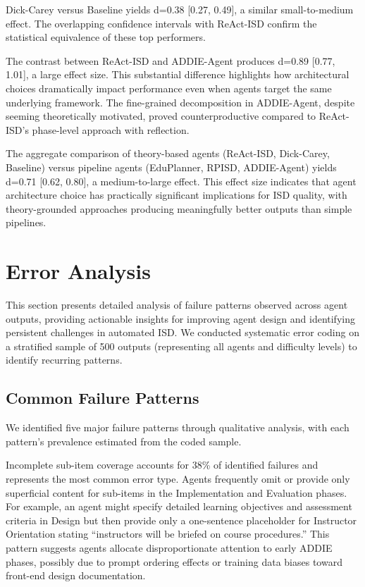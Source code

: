 Dick-Carey versus Baseline yields d=0.38 [0.27, 0.49], a similar small-to-medium effect. The overlapping confidence intervals with ReAct-ISD confirm the statistical equivalence of these top performers.

The contrast between ReAct-ISD and ADDIE-Agent produces d=0.89 [0.77, 1.01], a large effect size. This substantial difference highlights how architectural choices dramatically impact performance even when agents target the same underlying framework. The fine-grained decomposition in ADDIE-Agent, despite seeming theoretically motivated, proved counterproductive compared to ReAct-ISD's phase-level approach with reflection.

The aggregate comparison of theory-based agents (ReAct-ISD, Dick-Carey, Baseline) versus pipeline agents (EduPlanner, RPISD, ADDIE-Agent) yields d=0.71 [0.62, 0.80], a medium-to-large effect. This effect size indicates that agent architecture choice has practically significant implications for ISD quality, with theory-grounded approaches producing meaningfully better outputs than simple pipelines.

\FloatBarrier
\section{Error Analysis}
\label{app:error-analysis}

This section presents detailed analysis of failure patterns observed across agent outputs, providing actionable insights for improving agent design and identifying persistent challenges in automated ISD. We conducted systematic error coding on a stratified sample of 500 outputs (representing all agents and difficulty levels) to identify recurring patterns.

\subsection{Common Failure Patterns}

We identified five major failure patterns through qualitative analysis, with each pattern's prevalence estimated from the coded sample.

Incomplete sub-item coverage accounts for 38\% of identified failures and represents the most common error type. Agents frequently omit or provide only superficial content for sub-items in the Implementation and Evaluation phases. For example, an agent might specify detailed learning objectives and assessment criteria in Design but then provide only a one-sentence placeholder for Instructor Orientation stating ``instructors will be briefed on course procedures.'' This pattern suggests agents allocate disproportionate attention to early ADDIE phases, possibly due to prompt ordering effects or training data biases toward front-end design documentation.

